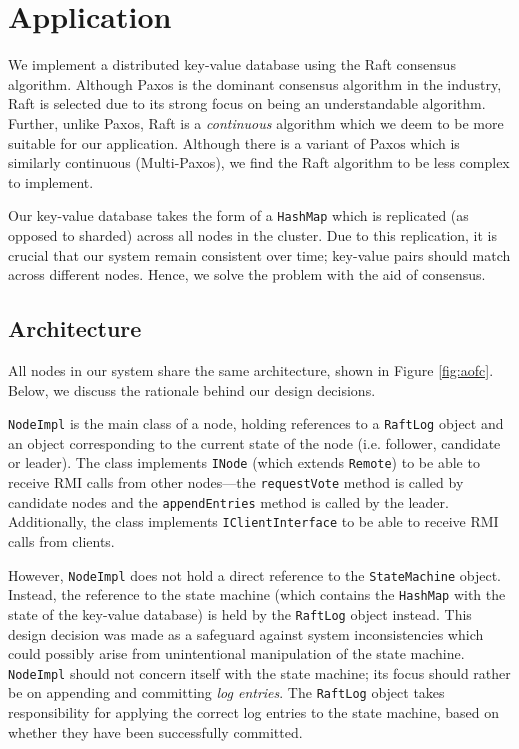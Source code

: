 \documentclass[12pt, a4paper]{article}
\begin{document}
\section{Application} \label{sec:application}
We implement a distributed key-value database using the Raft consensus algorithm. Although Paxos is the dominant consensus algorithm in the industry, Raft is selected due to its strong focus on being an understandable algorithm. Further, unlike Paxos, Raft is a \textit{continuous} algorithm which we deem to be more suitable for our application. Although there is a variant of Paxos which is similarly continuous (Multi-Paxos), we find the Raft algorithm to be less complex to implement. 

Our key-value database takes the form of a \texttt{HashMap} which is replicated (as opposed to sharded) across all nodes in the cluster. Due to this replication, it is crucial that our system remain consistent over time; key-value pairs should match across different nodes. Hence, we solve the problem with the aid of consensus.

\subsection{Architecture}
All nodes in our system share the same architecture, shown in Figure \ref{fig:aofc}. Below, we discuss the rationale behind our design decisions.

\texttt{NodeImpl} is the main class of a node, holding references to a \texttt{RaftLog} object and an object corresponding to the current state of the node (i.e. follower, candidate or leader). The class implements \texttt{INode} (which extends \texttt{Remote}) to be able to receive RMI calls from other nodes---the \texttt{requestVote} method is called by candidate nodes and the \texttt{appendEntries} method is called by the leader. Additionally, the class implements \texttt{IClientInterface} to be able to receive RMI calls from clients.

However, \texttt{NodeImpl} does not hold a direct reference to the \texttt{StateMachine} object. Instead, the reference to the state machine (which contains the \texttt{HashMap} with the state of the key-value database) is held by the \texttt{RaftLog} object instead. This design decision was made as a safeguard against system inconsistencies which could possibly arise from unintentional manipulation of the state machine. \texttt{NodeImpl} should not concern itself with the state machine; its focus should rather be on appending and committing \textit{log entries}. The \texttt{RaftLog} object takes responsibility for applying the correct log entries to the state machine, based on whether they have been successfully committed.
\end{document}
